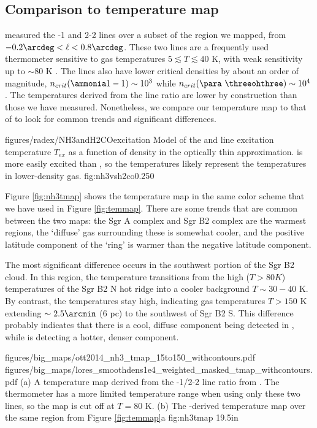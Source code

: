\subsection{Comparison to \citet{Ott2014a} \ammonia temperature map}
\label{sec:ammoniacompare}
\citet{Ott2014a} measured the -1 and 2-2 lines over a subset of the
region we mapped, from $-0.2\arcdeg < \ell < 0.8\arcdeg$.  These two lines are
a frequently
used thermometer sensitive to gas temperatures $5 \lesssim T \lesssim 40$ K,
with weak sensitivity up to $\sim80$ K \citep[][Figure 1]{Mangum2013a}.  The
\ammonia lines also have lower critical densities by about an order of
magnitude, $n_{crit}(\ammonia 1-1)\sim10^3$ \percc while $n_{crit}(\para~
\threeohthree)\sim10^4$ \percc \citep[Figure
\ref{fig:nh3vsh2co}][]{Shirley2015a}.  The temperatures derived from the
\ammonia line ratio are lower by construction than those we have
measured.  Nonetheless, we compare our temperature map to that of
\citet{Ott2014a} to look for common trends and significant differences.

\Figure
{figures/radex/NH3andH2COexcitation}
{Model of the \ammonia and \para line excitation temperature $T_{ex}$ as a function
of density in the optically thin approximation.   \ammonia is more easily
excited than \para, so the \ammonia temperatures likely represent the
temperatures in lower-density gas.}
{fig:nh3vsh2co}{0.25}{0}

Figure \ref{fig:nh3tmap} shows the \citet{Ott2014a} temperature map in the same
color scheme that we have used in Figure \ref{fig:temmap}.  There are some
trends that are common between the two maps: the Sgr A complex and Sgr B2
complex are the warmest regions, the `diffuse' gas surrounding these is
somewhat cooler, and the positive latitude component of the
\citet{Molinari2011a} `ring' is warmer than the negative latitude
component.

The most significant difference occurs in the southwest portion of the Sgr B2
cloud.  In this region, the \ammonia temperature transitions from the high
($T>80K$) temperatures of the Sgr B2 N hot ridge into a cooler background
$T\sim30-40$ K.  By contrast, the \formaldehyde temperatures stay high,
indicating gas temperatures $T>150$ K extending $\sim2.5\arcmin$ (6 pc) to the
southwest of Sgr B2 S.  This difference probably indicates that there is a
cool, diffuse component being detected in \ammonia, while
\formaldehyde is detecting a hotter, denser component.

\RotFigureTwoAA
{figures/big_maps/ott2014_nh3_tmap_15to150_withcontours.pdf}
{figures/big_maps/lores_smoothdens1e4_weighted_masked_tmap_withcontours.pdf}
{(a) A temperature map derived from the -1/2-2 line ratio from
\citet{Ott2014a}.  The \ammonia thermometer has a more limited temperature
range when using only these two lines, so the map is cut off at $T=80$ K.
(b) The \para-derived temperature map over the same region from Figure
\ref{fig:temmap}a
}
{fig:nh3tmap}
{1}{9.5in}

